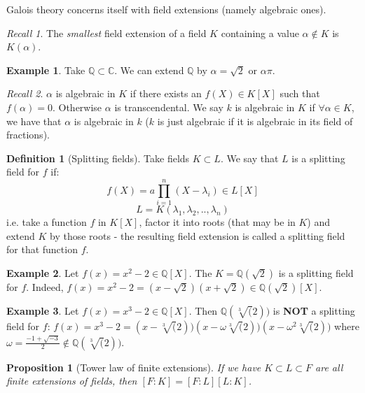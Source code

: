 \documentclass{article}
\theoremstyle{definition}
\newtheorem{defn}{Definition}[section]
\newtheorem{exmp}{Example}[section]
\theoremstyle{plain}%
\newtheorem{prop}[thm]{Proposition}
\theoremstyle{remark}
\newtheorem*{rec}{Recall}
\begin{document}
\begin{flushleft}
Galois theory concerns itself with field extensions (namely algebraic ones).
\end{flushleft}

\begin{rec}
The \textit{smallest} field extension of a field $K$ containing a value $\alpha \not\in K$ is $K(\alpha)$.
\end{rec}

\begin{exmp}
Take $\mathbb{Q} \subset \mathbb{C}$. We can extend $\mathbb{Q}$ by $\alpha = \sqrt{2}$ or $\alpha{\pi}$.
\end{exmp}

\begin{rec}
$\alpha$ is algebraic in $K$ if there exists an $f(X) \in K[X]$ such that $f(\alpha) = 0$. Otherwise $\alpha$ is transcendental. We say $k$ is algebraic in $K$ if $\forall \alpha \in K$, we have that $\alpha$ is algebraic in $k$ ($k$ is just algebraic if it is algebraic in its field of fractions).
\end{rec}

\begin{defn}[Splitting fields]
Take fields $K \subset L$. We say that $L$ is a splitting field for $f$ if: \[f(X) = a\prod_{i=1}^n(X - \lambda_i) \in L[X]\] \[L = K(\lambda_1, \lambda_2, .., \lambda_n)\]
i.e. take a function $f$ in $K[X]$, factor it into roots (that may be in $K$) and extend $K$ by those roots - the resulting field extension is called a splitting field for that function $f$.
\end{defn}

\begin{exmp}
Let $f(x) = x^2 - 2 \in \mathbb{Q}[X]$. The $K = \mathbb{Q}(\sqrt{2})$ is a splitting field for $f$. Indeed, $f(x) = x^2 - 2 = (x - \sqrt{2})(x + \sqrt{2}) \in \mathbb{Q}(\sqrt{2})[X]$. 
\end{exmp}

\begin{exmp}
Let $f(x) = x^3 - 2 \in \mathbb{Q}[X]$. Then $\mathbb{Q}(\sqrt[3](2))$ is \textbf{NOT} a splitting field for $f$: $f(x) = x^3 - 2 = (x - \sqrt[3](2))(x - \omega \sqrt[3](2))(x - \omega^2 \sqrt[3](2))$ where $\omega = \frac{-1 + \sqrt{-3}}{2} \not\in \mathbb{Q}(\sqrt[3](2))$.
\end{exmp}

\begin{prop}[Tower law of finite extensions]
If we have $K \subset L \subset F$ are all finite extensions of fields, then $[F:K] = [F:L][L:K]$.
\end{prop}
\end{document}
